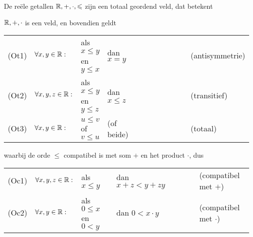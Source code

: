 \documentclass{ximera}
\begin{document}
    \begin{proposition} De reële getallen $\mathbb{R},+,\cdot,\leqslant$ zijn een totaal geordend veld, dat betekent

        $\mathbb{R},+,\cdot$ is een veld, en bovendien geldt

        \begin{tabular}{llllll}
            (Ot1) & $\forall x,y \in\mathbb{R}:$ & als $ x \leq y $ en  $y \leq x$ & dan $ x=y$       & $\qquad\qquad\qquad$& (antisymmetrie) \\
            (Ot2) & $\forall x,y,z \in\mathbb{R}:$ & als $ x \leq y $ en  $y \leq z$ & dan $x\leq z$  & $\qquad\qquad\qquad$& (transitief) \\
            (Ot3) & $\forall x,y \in\mathbb{R}:$ & $ u \leq v $ of  $v \leq u $ & (of beide)          & $\qquad\qquad\qquad$& (totaal) 
        \end{tabular}

        waarbij de orde $\leq$ compatibel is met som $+$ en het product $\cdot$, dus
        
        \begin{tabular}{llllll}
            (Oc1) & $\forall x,y,z \in\mathbb{R}:$ & als $ x \leq y$ & dan $x+z < y+z y$           & $\qquad$& (compatibel met $+$) \\
            (Oc2) & $\forall x,y \in\mathbb{R}:$ & als $ 0 \leq x$ en $0< y $& dan $0 < x\cdot y$  & $\qquad$& (compatibel met $\cdot$) 
        \end{tabular}

    \end{proposition}
         
\end{document}
